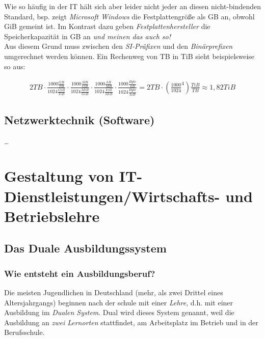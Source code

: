 \documentclass[a4paper, 12pt]{report}
\begin{document}
Wie so häufig in der IT hält sich aber leider nicht jeder an diesen 
nicht-bindenden Standard, bsp. zeigt \emph{Microsoft Windows} die 
Festplattengröße als GB an, obwohl GiB gemeint ist. Im Kontrast dazu geben
\emph{Festplattenhersteller} die Speicherkapazität in GB an \emph{und meinen 
das auch so!} \\

Aus diesem Grund muss zwischen den \emph{SI-Präfixen} und den 
\emph{Binärprefixen} umgerechnet werden können. Ein Rechenweg von TB in 
TiB sieht beispielsweise so aus: 

\begin{center}
    \begin{equation}
        \begin{split}
            2TB \cdot \frac{1000 \frac{GB}{TB}}{1024 \frac{GiB}{TiB}} 
            \cdot \frac{1000 \frac{MB}{GB}}{1024 \frac{MiB}{GiB}} 
            \cdot \frac{1000 \frac{kB}{MB}}{1024 \frac{kiB}{MiB}} 
            \cdot \frac{1000 \frac{Byte}{kB}}{1024 \frac{Byte}{kiB}} 
            = 2TB \cdot \left( \frac{1000}{1024}^4 \right) \frac{TiB}{TB} 
            \approx 1,82 TiB
        \end{split}
    \end{equation}
\end{center}


\section{Netzwerktechnik (Software)}
\dots


\chapter{Gestaltung von IT-Dienstleistungen/Wirtschafts- und Betriebslehre}

\section{Das Duale Ausbildungssystem}

\subsection{Wie entsteht ein Ausbildungsberuf?}

Die meisten Jugendlichen in Deutschland (mehr, als zwei Drittel eines 
Altersjahrgangs) beginnen nach der schule mit einer \emph{Lehre}, d.h. mit 
einer Ausbildung im \emph{Dualen System}. Dual wird dieses System genannt, weil
die Ausbildung an \emph{zwei Lernorten} stattfindet, am Arbeitsplatz im Betrieb
und in der Berufsschule. \\
\end{document}
